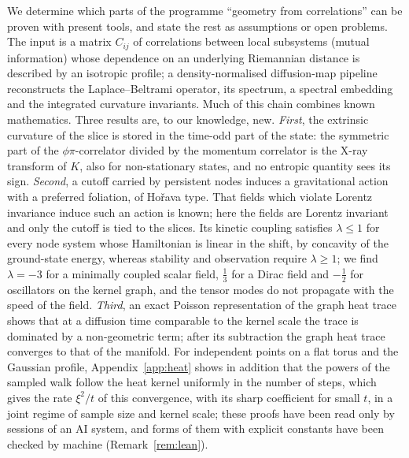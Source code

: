 \documentclass[11pt,a4paper]{article}
\theoremstyle{stmt}
\theoremstyle{defn}
\theoremstyle{rmk}
\numberwithin{equation}{section}
\begin{document}
\par\vspace{3pt}
{\small\noindent We determine which parts of the programme ``geometry from correlations'' can be proven with present tools, and state the rest as assumptions or open problems. The input is a matrix $C_{ij}$ of correlations between local subsystems (mutual information) whose dependence on an underlying Riemannian distance is described by an isotropic profile; a density-normalised diffusion-map pipeline reconstructs the Laplace--Beltrami operator, its spectrum, a spectral embedding and the integrated curvature invariants. Much of this chain combines known mathematics. Three results are, to our knowledge, new. \emph{First}, the extrinsic curvature of the slice is stored in the time-odd part of the state: the symmetric part of the $\phi\pi$-correlator divided by the momentum correlator is the X-ray transform of $K$, also for non-stationary states, and no entropic quantity sees its sign. \emph{Second}, a cutoff carried by persistent nodes induces a gravitational action with a preferred foliation, of Ho\v{r}ava type. That fields which violate Lorentz invariance induce such an action is known; here the fields are Lorentz invariant and only the cutoff is tied to the slices. Its kinetic coupling satisfies $\lambda\le1$ for every node system whose Hamiltonian is linear in the shift, by concavity of the ground-state energy, whereas stability and observation require $\lambda\ge1$; we find $\lambda=-3$ for a minimally coupled scalar field, $\tfrac13$ for a Dirac field and $-\tfrac12$ for oscillators on the kernel graph, and the tensor modes do not propagate with the speed of the field. \emph{Third}, an exact Poisson representation of the graph heat trace shows that at a diffusion time comparable to the kernel scale the trace is dominated by a non-geometric term; after its subtraction the graph heat trace converges to that of the manifold. For independent points on a flat torus and the Gaussian profile, Appendix~\ref{app:heat} shows in addition that the powers of the sampled walk follow the heat kernel uniformly in the number of steps, which gives the rate $\xi^2/t$ of this convergence, with its sharp coefficient for small $t$, in a joint regime of sample size and kernel scale; these proofs have been read only by sessions of an AI system, and forms of them with explicit constants have been checked by machine (Remark~\ref{rem:lean}).

}
\end{document}
